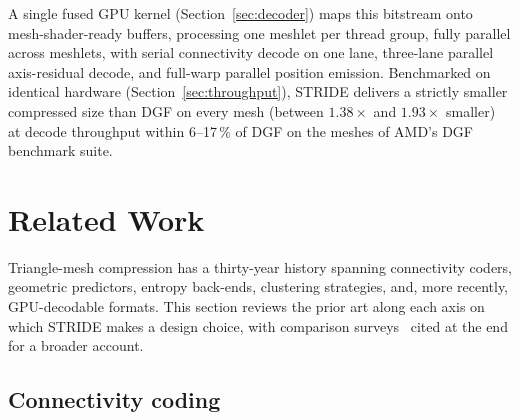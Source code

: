 \documentclass[pdflatex,sn-vancouver-num]{sn-jnl}%
\theoremstyle{thmstyleone}%
\theoremstyle{thmstyletwo}%
\theoremstyle{thmstylethree}%
\begin{document}
A single fused GPU kernel (Section~\ref{sec:decoder}) maps this bitstream onto mesh-shader-ready buffers, processing one meshlet per thread group, fully parallel across meshlets, with serial connectivity decode on one lane, three-lane parallel axis-residual decode, and full-warp parallel position emission. Benchmarked on identical hardware (Section~\ref{sec:throughput}), STRIDE delivers a strictly smaller compressed size than DGF on every mesh (between $1.38\times$ and $1.93\times$ smaller) at decode throughput within 6--17\,\% of DGF on the meshes of AMD's DGF benchmark suite.

\section{Related Work}\label{sec:related}

Triangle-mesh compression has a thirty-year history spanning connectivity coders, geometric predictors, entropy back-ends, clustering strategies, and, more recently, GPU-decodable formats. This section reviews the prior art along each axis on which STRIDE makes a design choice, with comparison surveys~\cite{ref14_peng_2005,ref15_maglo_2015} cited at the end for a broader account.

\subsection{Connectivity coding}
\end{document}
